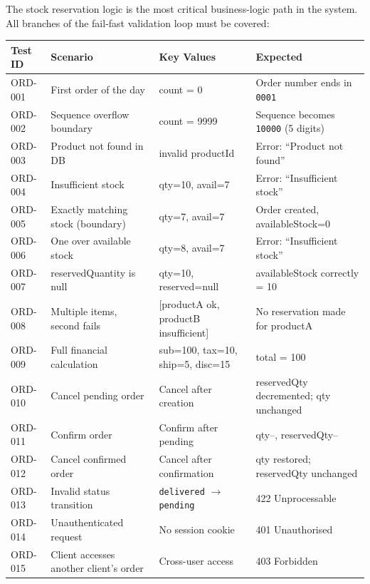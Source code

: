\documentclass[12pt,a4paper]{report}
\begin{document}
The stock reservation logic is the most critical business-logic path in the system. All branches of the fail-fast validation loop must be covered:

\begin{longtable}{p{}p{}p{}p{}}
    \toprule
    \textbf{Test ID} & \textbf{Scenario} & \textbf{Key Values} & \textbf{Expected} \\
    \midrule
    \endhead
    ORD-001 & First order of the day & count = 0 & Order number ends in \texttt{0001} \\
    ORD-002 & Sequence overflow boundary & count = 9999 & Sequence becomes \texttt{10000} (5 digits) \\
    ORD-003 & Product not found in DB & invalid productId & Error: ``Product not found'' \\
    ORD-004 & Insufficient stock & qty=10, avail=7 & Error: ``Insufficient stock'' \\
    ORD-005 & Exactly matching stock (boundary) & qty=7, avail=7 & Order created, availableStock=0 \\
    ORD-006 & One over available stock & qty=8, avail=7 & Error: ``Insufficient stock'' \\
    ORD-007 & reservedQuantity is null & qty=10, reserved=null & availableStock correctly = 10 \\
    ORD-008 & Multiple items, second fails & [productA ok, productB insufficient] & No reservation made for productA \\
    ORD-009 & Full financial calculation & sub=100, tax=10, ship=5, disc=15 & total = 100 \\
    ORD-010 & Cancel pending order & Cancel after creation & reservedQty decremented; qty unchanged \\
    ORD-011 & Confirm order & Confirm after pending & qty--, reservedQty-- \\
    ORD-012 & Cancel confirmed order & Cancel after confirmation & qty restored; reservedQty unchanged \\
    ORD-013 & Invalid status transition & \texttt{delivered} $\to$ \texttt{pending} & 422 Unprocessable \\
    ORD-014 & Unauthenticated request & No session cookie & 401 Unauthorised \\
    ORD-015 & Client accesses another client's order & Cross-user access & 403 Forbidden \\
    \bottomrule
\end{longtable}
\end{document}
